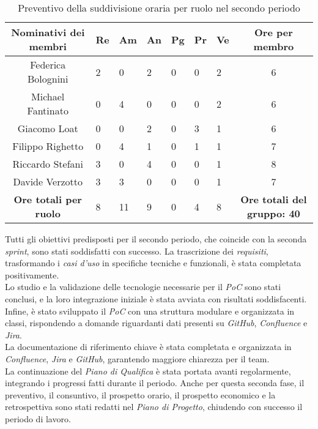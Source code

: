 \begin{table}[h!]
    \centering
    \renewcommand{\arraystretch}{1.5}
    \begin{tabularx}{\textwidth}{|c|X|X|X|X|X|X|c|}\hline
    \rowcolor[HTML]{FFD700} 
    \textbf{Nominativi dei membri} & \textbf{Re} & \textbf{Am} & \textbf{An} & \textbf{Pg} & \textbf{Pr} & \textbf{Ve} & \textbf{Ore per membro} \\ \hline
    Federica Bolognini  & 2 & 0 & 2 & 0 & 0 & 2 & 6 \\ \hline
    Michael Fantinato   & 0 & 4 & 0 & 0 & 0 & 2 & 6 \\ \hline
    Giacomo Loat        & 0 & 0 & 2 & 0 & 3 & 1 & 6 \\ \hline
    Filippo Righetto    & 0 & 4 & 1 & 0 & 1 & 1 & 7 \\ \hline
    Riccardo Stefani    & 3 & 0 & 4 & 0 & 0 & 1 & 8 \\ \hline
    Davide Verzotto     & 3 & 3 & 0 & 0 & 0 & 1 & 7 \\ \hline
    \rowcolor[HTML]{FFD700} 
    \textbf{Ore totali per ruolo} & 8 & 11 & 9 & 0 & 4 & 8 & \textbf{Ore totali del gruppo: 40} \\ \hline
    \end{tabularx}
    \caption{Preventivo della suddivisione oraria per ruolo nel secondo periodo}
\end{table}

Tutti gli obiettivi predisposti per il secondo periodo, che coincide con la seconda \emph{sprint}, sono stati soddisfatti con successo. La trascrizione dei \emph{requisiti}, trasformando i \emph{casi d’uso} in specifiche tecniche e funzionali, è stata completata positivamente.\\
Lo studio e la validazione delle tecnologie necessarie per il \emph{PoC} sono stati conclusi, e la loro integrazione iniziale è stata avviata con risultati soddisfacenti. Infine, è stato sviluppato il \emph{PoC} con una struttura modulare e organizzata in classi, rispondendo a domande riguardanti dati presenti su \emph{GitHub}, \emph{Confluence} e \emph{Jira}.\\
La documentazione di riferimento chiave è stata completata e organizzata in \emph{Confluence}, \emph{Jira} e \emph{GitHub}, garantendo maggiore chiarezza per il team.\\
La continuazione del \emph{Piano di Qualifica} è stata portata avanti regolarmente, integrando i progressi fatti durante il periodo. Anche per questa seconda fase, il preventivo, il consuntivo, il prospetto orario, il prospetto economico e la retrospettiva sono stati redatti nel \textit{Piano di Progetto}, chiudendo con successo il periodo di lavoro.


